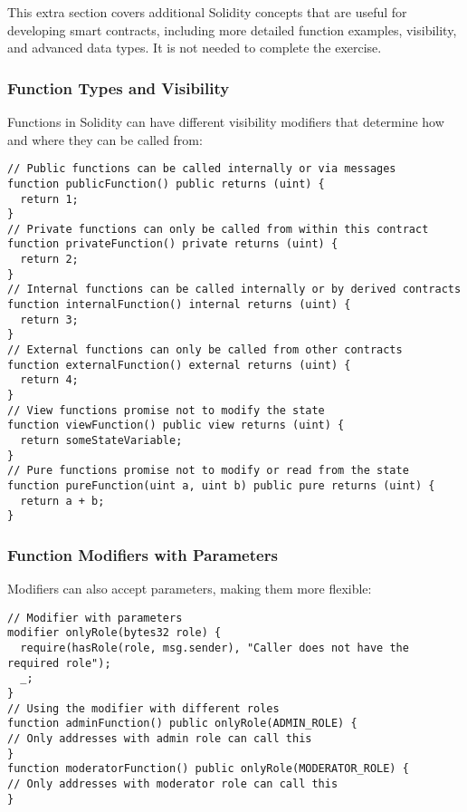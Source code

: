\documentclass[12pt]{article}
\begin{document}
This extra section covers additional Solidity concepts that are useful for
developing smart contracts, including more detailed function examples,
visibility, and advanced data types. It is not needed to complete the exercise.

\subsubsection*{Function Types and Visibility}
Functions in Solidity can have different visibility modifiers that determine how and where they can be called from:

\noindent
\begin{minipage}[c]{\textwidth}
  \begin{lstlisting}[language=Solidity]
// Public functions can be called internally or via messages
function publicFunction() public returns (uint) {
  return 1;
}
// Private functions can only be called from within this contract
function privateFunction() private returns (uint) {
  return 2;
}
// Internal functions can be called internally or by derived contracts
function internalFunction() internal returns (uint) {
  return 3;
}
// External functions can only be called from other contracts
function externalFunction() external returns (uint) {
  return 4;
}
// View functions promise not to modify the state
function viewFunction() public view returns (uint) {
  return someStateVariable;
}
// Pure functions promise not to modify or read from the state
function pureFunction(uint a, uint b) public pure returns (uint) {
  return a + b;
}
\end{lstlisting}
\end{minipage}

\subsubsection*{Function Modifiers with Parameters}

Modifiers can also accept parameters, making them more flexible:

\noindent
\begin{minipage}[c]{\textwidth}
  \begin{lstlisting}[language=Solidity]
// Modifier with parameters
modifier onlyRole(bytes32 role) {
  require(hasRole(role, msg.sender), "Caller does not have the required role");
  _;
}
// Using the modifier with different roles
function adminFunction() public onlyRole(ADMIN_ROLE) {
// Only addresses with admin role can call this
}
function moderatorFunction() public onlyRole(MODERATOR_ROLE) {
// Only addresses with moderator role can call this
}
\end{lstlisting}
\end{minipage}
\end{document}
